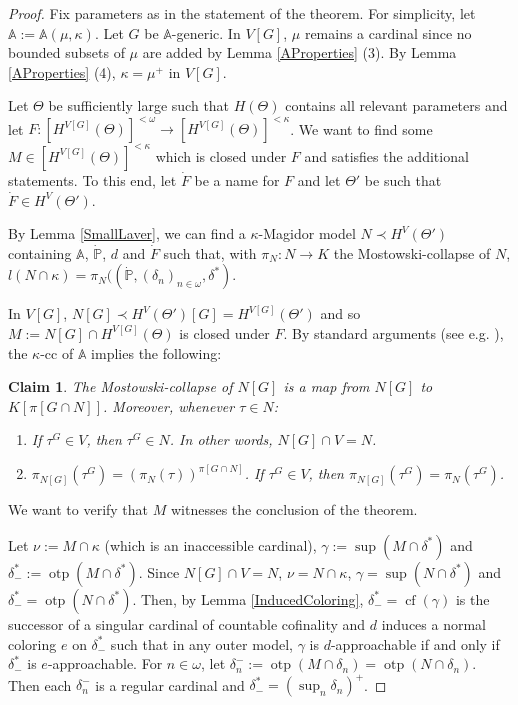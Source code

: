 \documentclass[a4paper]{amsart}
\theoremstyle{definition}
\theoremstyle{remark}
\theoremstyle{plain}
\newtheorem{myclaim}{Claim}
\numberwithin{mydef}{section}
\DeclareMathOperator{\otp}{otp}
\DeclareMathOperator{\cf}{cf}
\newcommand{\dA}{\mathbb{A}}
\newcommand{\dP}{\mathbb{P}}
\begin{document}
	\begin{proof}
		
		\setcounter{myclaim}{0}
		
		Fix parameters as in the statement of the theorem. For simplicity, let $\dA:=\dA(\mu,\kappa)$. Let $G$ be $\dA$-generic. In $V[G]$, $\mu$ remains a cardinal since no bounded subsets of $\mu$ are added by Lemma \ref{AProperties} (3). By Lemma \ref{AProperties} (4), $\kappa=\mu^+$ in $V[G]$.
		
		Let $\Theta$ be sufficiently large such that $H(\Theta)$ contains all relevant parameters and let $F\colon[H^{V[G]}(\Theta)]^{<\omega}\to[H^{V[G]}(\Theta)]^{<\kappa}$. We want to find some $M\in[H^{V[G]}(\Theta)]^{<\kappa}$ which is closed under $F$ and satisfies the additional statements. To this end, let $\dot{F}$ be a name for $F$ and let $\Theta'$ be such that $\dot{F}\in H^V(\Theta')$.
		
		By Lemma \ref{SmallLaver}, we can find a $\kappa$-Magidor model $N\prec H^V(\Theta')$ containing $\dA$, $\dot{\dP}$, $d$ and $\dot{F}$ such that, with $\pi_N\colon N\to K$ the Mostowski-collapse of $N$, $l(N\cap\kappa)=\pi_N((\dot{\dP},(\delta_n)_{n\in\omega},\delta^*)$.
		
		In $V[G]$, $N[G]\prec H^V(\Theta')[G]=H^{V[G]}(\Theta')$ and so $M:=N[G]\cap H^{V[G]}(\Theta)$ is closed under $F$. By standard arguments (see e.g. \cite[Lemma 5.3.6]{JakobPhD}), the $\kappa$-cc of $\dA$ implies the following:
		
		\begin{myclaim}
			The Mostowski-collapse of $N[G]$ is a map from $N[G]$ to $K[\pi[G\cap N]]$. Moreover, whenever $\tau\in N$:
			\begin{enumerate}
				\item If $\tau^G\in V$, then $\tau^G\in N$. In other words, $N[G]\cap V=N$.
				\item $\pi_{N[G]}(\tau^G)=(\pi_N(\tau))^{\pi[G\cap N]}$. If $\tau^G\in V$, then $\pi_{N[G]}(\tau^G)=\pi_N(\tau^G)$.
			\end{enumerate}
		\end{myclaim}
		
		We want to verify that $M$ witnesses the conclusion of the theorem.
		
		Let $\nu:=M\cap\kappa$ (which is an inaccessible cardinal), $\gamma:=\sup(M\cap\delta^*)$ and $\delta_-^*:=\otp(M\cap\delta^*)$. Since $N[G]\cap V=N$, $\nu=N\cap\kappa$, $\gamma=\sup(N\cap\delta^*)$ and $\delta_-^*=\otp(N\cap\delta^*)$. Then, by Lemma \ref{InducedColoring}, $\delta_-^*=\cf(\gamma)$ is the successor of a singular cardinal of countable cofinality and $d$ induces a normal coloring $e$ on $\delta_-^*$ such that in any outer model, $\gamma$ is $d$-approachable if and only if $\delta_-^*$ is $e$-approachable. For $n\in\omega$, let $\delta_n^-:=\otp(M\cap\delta_n)=\otp(N\cap\delta_n)$. Then each $\delta_n^-$ is a regular cardinal and $\delta_-^*=(\sup_n\delta_n)^+$.
		

\end{proof}
\end{document}
